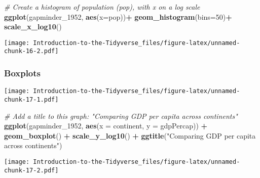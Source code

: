 \documentclass[
]{article}
\newenvironment{Shaded}{\begin{snugshade}}{\end{snugshade}}
\newcommand{\CommentTok}[1]{\textcolor[rgb]{0.56,0.35,0.01}{\textit{#1}}}
\newcommand{\DataTypeTok}[1]{\textcolor[rgb]{0.13,0.29,0.53}{#1}}
\newcommand{\DecValTok}[1]{\textcolor[rgb]{0.00,0.00,0.81}{#1}}
\newcommand{\KeywordTok}[1]{\textcolor[rgb]{0.13,0.29,0.53}{\textbf{#1}}}
\newcommand{\NormalTok}[1]{#1}
\newcommand{\OperatorTok}[1]{\textcolor[rgb]{0.81,0.36,0.00}{\textbf{#1}}}
\newcommand{\StringTok}[1]{\textcolor[rgb]{0.31,0.60,0.02}{#1}}
\begin{document}
\begin{Shaded}
\begin{Highlighting}[]
\CommentTok{# Create a histogram of population (pop), with x on a log scale}
\KeywordTok{ggplot}\NormalTok{(gapminder_}\DecValTok{1952}\NormalTok{, }\KeywordTok{aes}\NormalTok{(}\DataTypeTok{x=}\NormalTok{pop))}\OperatorTok{+}
\StringTok{ }\KeywordTok{geom_histogram}\NormalTok{(}\DataTypeTok{bins=}\DecValTok{50}\NormalTok{)}\OperatorTok{+}
\StringTok{ }\KeywordTok{scale_x_log10}\NormalTok{()}
\end{Highlighting}
\end{Shaded}

\texttt{[image: Introduction-to-the-Tidyverse\_files/figure-latex/unnamed-chunk-16-2.pdf]}

\hypertarget{boxplots}{%
\subsubsection{Boxplots}\label{boxplots}}

\begin{Shaded}
\end{Shaded}

\texttt{[image: Introduction-to-the-Tidyverse\_files/figure-latex/unnamed-chunk-17-1.pdf]}

\begin{Shaded}
\begin{Highlighting}[]
\CommentTok{# Add a title to this graph: "Comparing GDP per capita across continents"}
\KeywordTok{ggplot}\NormalTok{(gapminder_}\DecValTok{1952}\NormalTok{, }\KeywordTok{aes}\NormalTok{(}\DataTypeTok{x =}\NormalTok{ continent, }\DataTypeTok{y =}\NormalTok{ gdpPercap)) }\OperatorTok{+}
\StringTok{  }\KeywordTok{geom_boxplot}\NormalTok{() }\OperatorTok{+}
\StringTok{  }\KeywordTok{scale_y_log10}\NormalTok{() }\OperatorTok{+}
\StringTok{  }\KeywordTok{ggtitle}\NormalTok{(}\StringTok{"Comparing GDP per capita across continents"}\NormalTok{)}
\end{Highlighting}
\end{Shaded}

\texttt{[image: Introduction-to-the-Tidyverse\_files/figure-latex/unnamed-chunk-17-2.pdf]}
\end{document}
